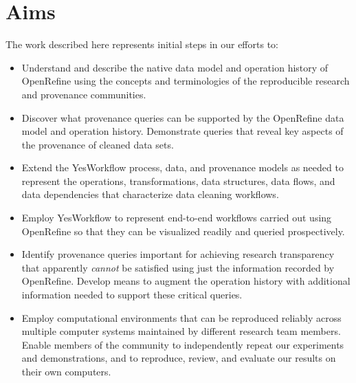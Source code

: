 \section{Aims}

The work described here represents initial steps in our efforts to:

\begin{itemize}[label=\raisebox{0.25ex}{\tiny$\bullet$}]

\item Understand and describe the native data model and operation history of OpenRefine using the concepts and terminologies of the reproducible research and provenance communities.

\item Discover what provenance queries can be supported by the OpenRefine data model and operation history.  Demonstrate queries that reveal key aspects of the provenance of cleaned data sets.

\item Extend the YesWorkflow process, data, and provenance models as needed to represent the operations, transformations, data structures, data flows, and data dependencies that characterize data cleaning workflows.  

\item Employ YesWorkflow to represent end-to-end workflows carried out using OpenRefine so that they can be visualized readily and queried prospectively.

\item Identify provenance queries important for achieving research transparency that apparently \emph{cannot} be satisfied using just the information recorded by OpenRefine. Develop means to augment the operation history with additional information needed to support these critical queries.

\item Employ computational environments that can be reproduced reliably across multiple computer systems maintained by different research team members. Enable members of the community to independently repeat our experiments and demonstrations, and to reproduce, review, and evaluate our results on their own computers.

\end{itemize}
